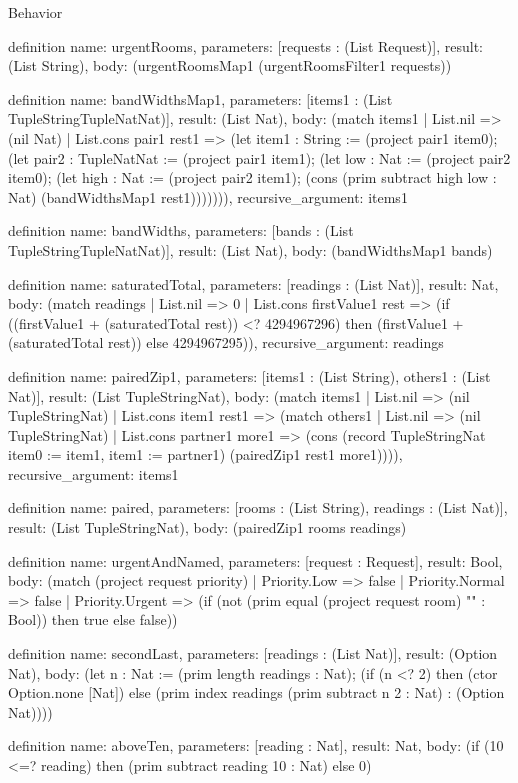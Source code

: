 \begin{lexlean}{Behavior}
\begin{semanticmodule}
definition{
  name: urgentRooms,
  parameters: [requests : (List Request)],
  result: (List String),
  body: (urgentRoomsMap1 (urgentRoomsFilter1 requests))
}

definition{
  name: bandWidthsMap1,
  parameters: [items1 : (List TupleStringTupleNatNat)],
  result: (List Nat),
  body: (match items1
    | List.nil => (nil Nat)
    | List.cons pair1 rest1 => (let item1 : String := (project pair1 item0); (let pair2 : TupleNatNat := (project pair1 item1); (let low : Nat := (project pair2 item0); (let high : Nat := (project pair2 item1); (cons (prim subtract high low : Nat) (bandWidthsMap1 rest1))))))),
  recursive_argument: items1
}

definition{
  name: bandWidths,
  parameters: [bands : (List TupleStringTupleNatNat)],
  result: (List Nat),
  body: (bandWidthsMap1 bands)
}

definition{
  name: saturatedTotal,
  parameters: [readings : (List Nat)],
  result: Nat,
  body: (match readings
    | List.nil => 0
    | List.cons firstValue1 rest => (if ((firstValue1 + (saturatedTotal rest)) <? 4294967296) then (firstValue1 + (saturatedTotal rest)) else 4294967295)),
  recursive_argument: readings
}

definition{
  name: pairedZip1,
  parameters: [items1 : (List String), others1 : (List Nat)],
  result: (List TupleStringNat),
  body: (match items1
    | List.nil => (nil TupleStringNat)
    | List.cons item1 rest1 => (match others1
      | List.nil => (nil TupleStringNat)
      | List.cons partner1 more1 => (cons (record TupleStringNat {item0 := item1, item1 := partner1}) (pairedZip1 rest1 more1)))),
  recursive_argument: items1
}

definition{
  name: paired,
  parameters: [rooms : (List String), readings : (List Nat)],
  result: (List TupleStringNat),
  body: (pairedZip1 rooms readings)
}

definition{
  name: urgentAndNamed,
  parameters: [request : Request],
  result: Bool,
  body: (match (project request priority)
    | Priority.Low => false
    | Priority.Normal => false
    | Priority.Urgent => (if (not (prim equal (project request room) "" : Bool)) then true else false))
}

definition{
  name: secondLast,
  parameters: [readings : (List Nat)],
  result: (Option Nat),
  body: (let n : Nat := (prim length readings : Nat); (if (n <? 2) then (ctor Option.none [Nat]) else (prim index readings (prim subtract n 2 : Nat) : (Option Nat))))
}

definition{
  name: aboveTen,
  parameters: [reading : Nat],
  result: Nat,
  body: (if (10 <=? reading) then (prim subtract reading 10 : Nat) else 0)
}


\end{semanticmodule}
\end{lexlean}
